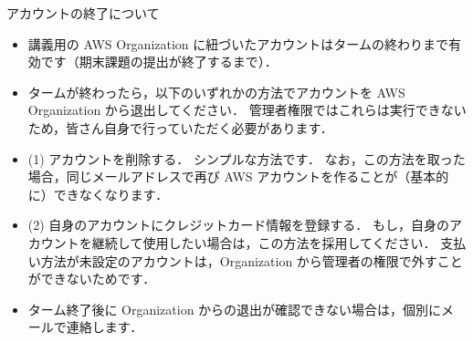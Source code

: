 \documentclass[unicode,11pt]{beamer}
\begin{document}
\begin{frame}{アカウントの終了について}

\begin{itemize}
    \item 講義用の AWS Organization に紐づいたアカウントはタームの終わりまで有効です（期末課題の提出が終了するまで）．
    \item タームが終わったら，以下のいずれかの方法でアカウントを AWS Organization から退出してください．
    管理者権限ではこれらは実行できないため，皆さん自身で行っていただく必要があります．
    \item (1) アカウントを削除する．
    シンプルな方法です．
    なお，この方法を取った場合，同じメールアドレスで再び AWS アカウントを作ることが（基本的に）できなくなります．
    \item (2) 自身のアカウントにクレジットカード情報を登録する．
    もし，自身のアカウントを継続して使用したい場合は，この方法を採用してください．
    支払い方法が未設定のアカウントは，Organization から管理者の権限で外すことができないためです．
    \item ターム終了後に Organization からの退出が確認できない場合は，個別にメールで連絡します．
\end{itemize}

\end{frame}
\end{document}
